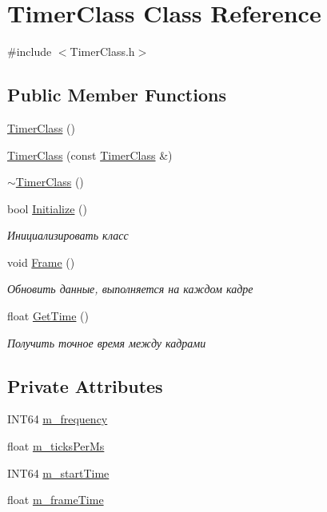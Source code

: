 \hypertarget{class_timer_class}{}\section{Timer\+Class Class Reference}
\label{class_timer_class}


{\ttfamily \#include $<$Timer\+Class.\+h$>$}

\subsection*{Public Member Functions}
\begin{DoxyCompactItemize}
\item 
\hyperlink{class_timer_class_a9ac295c3e61635d34c86abbb4c94869c}{Timer\+Class} ()
\item 
\hyperlink{class_timer_class_af0436af5e1123f941c833616003e8ec9}{Timer\+Class} (const \hyperlink{class_timer_class}{Timer\+Class} \&)
\item 
\hyperlink{class_timer_class_a408dda5491a2bec9385db139e90c4d2d}{$\sim$\+Timer\+Class} ()
\item 
bool \hyperlink{class_timer_class_ad19e65fd9cc771671a3fbdf75510bd49}{Initialize} ()
\begin{DoxyCompactList}\small\item\em Инициализировать класс \end{DoxyCompactList}\item 
void \hyperlink{class_timer_class_a38f90c92c63e720ecd129c1e9153a58d}{Frame} ()
\begin{DoxyCompactList}\small\item\em Обновить данные, выполняется на каждом кадре \end{DoxyCompactList}\item 
float \hyperlink{class_timer_class_a454dfe3e22e422bd1d2fe91eee1c1cb4}{Get\+Time} ()
\begin{DoxyCompactList}\small\item\em Получить точное время между кадрами \end{DoxyCompactList}\end{DoxyCompactItemize}
\subsection*{Private Attributes}
\begin{DoxyCompactItemize}
\item 
I\+N\+T64 \hyperlink{class_timer_class_a2b0287a45b8bcc5d5f9455afe8b8752a}{m\+\_\+frequency}
\item 
float \hyperlink{class_timer_class_a6f456840eeafb0f8254b59f32179f565}{m\+\_\+ticks\+Per\+Ms}
\item 
I\+N\+T64 \hyperlink{class_timer_class_a69f2c0f9ca8be59d142abd9c7582923a}{m\+\_\+start\+Time}
\item 
float \hyperlink{class_timer_class_accda427afa86647ede2278646a71e674}{m\+\_\+frame\+Time}
\end{DoxyCompactItemize}


